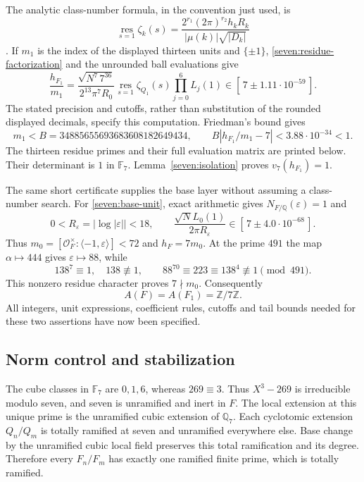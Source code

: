 \documentclass[11pt]{article}
\begin{document}
The analytic class-number formula, in the convention just used, is
\[
 \operatorname*{res}_{s=1}\zeta_k(s)
  =\frac{2^{r_1}(2\pi)^{r_2}h_kR_k}
         {|\mu(k)|\sqrt{|D_k|}}
 \tag{S23}\label{seven:class-formula}
\]
\cite[Theorem~18.13]{sevenSutherland2015}.
If $m_1$ is the index of the displayed thirteen units and $\{\pm1\}$,
\eqref{seven:residue-factorization} and the unrounded ball evaluations give
\[
 \frac{h_{F_1}}{m_1}
 =\frac{\sqrt{N^7\,7^{36}}}
        {2^{13}\pi^7R_0}
   \operatorname*{res}_{s=1}\zeta_{Q_1}(s)\prod_{j=0}^6L_j(1)
 \in[\,7\pm1.11\cdot10^{-59}\,].
 \tag{S24}\label{seven:quotient-interval}
\]
The stated precision and cutoffs, rather than substitution of the rounded
displayed decimals, specify this computation.
Friedman's bound gives
\[
 m_1<B=34885655693683608182649434,
 \qquad
 B\left|h_{F_1}/m_1-7\right|<3.88\cdot10^{-34}<1.
 \tag{S25}\label{seven:index-bound}
\]
The thirteen residue primes and their full evaluation matrix are printed
below. Their determinant is $1$ in $\mathbb F_7$.
Lemma~\ref{seven:isolation} proves $v_7(h_{F_1})=1$.

The same short certificate supplies the base layer without assuming a
class-number search. For \eqref{seven:base-unit}, exact arithmetic gives
$N_{F/\mathbb Q}(\varepsilon)=1$ and
\[
 0<R_\varepsilon=|\log|\varepsilon||<18,\qquad
 \frac{\sqrt N L_0(1)}{2\pi R_\varepsilon}
 \in[\,7\pm4.0\cdot10^{-68}\,].
 \tag{S26}\label{seven:base-quotient}
\]
Thus $m_0=[\mathcal O_F^\times:\langle-1,\varepsilon\rangle]<72$ and
$h_F=7m_0$.
At the prime $491$ the map $\alpha\mapsto444$ gives
$\varepsilon\mapsto88$, while
\[
 138^7\equiv1,\quad138\not\equiv1,\qquad
 88^{70}\equiv223\equiv138^4\not\equiv1\pmod{491}.
 \tag{S27}\label{seven:base-saturation}
\]
This nonzero residue character proves $7\nmid m_0$.
Consequently
\[
 A(F)=A(F_1)=\mathbb Z/7\mathbb Z.
 \tag{S28}\label{seven:finite-inputs}
\]
All integers, unit expressions, coefficient rules, cutoffs and tail bounds
needed for these two assertions have now been specified.

\subsection{Norm control and stabilization}
\label{seven:stability-proof}

The cube classes in $\mathbb F_7$ are $0,1,6$, whereas $269\equiv3$.
Thus $X^3-269$ is irreducible modulo seven, and seven is unramified and inert
in $F$. The local extension at this unique prime is the unramified cubic
extension of $\mathbb Q_7$.
Each cyclotomic extension $Q_n/Q_m$ is totally ramified at seven and
unramified everywhere else. Base change by the unramified cubic local
field preserves this total ramification and its degree. Therefore every
$F_n/F_m$ has exactly one ramified finite prime, which is totally ramified.
\end{document}

